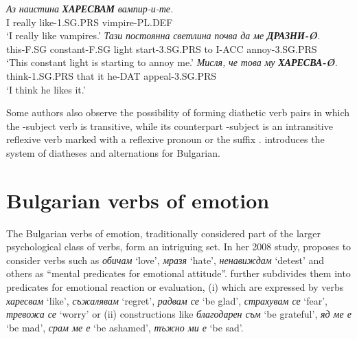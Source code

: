 \documentclass[output=paper,colorlinks,citecolor=brown]{langscibook}
\begin{document}
\begin{exe} 
\ex  \label{ch6:ex2} 
\begin{xlist}
\ex\label{ch6:ex2a} 
\gll \textit{Аз} \textit{наистина} \textit{\uppercase{\textbf{харесвам}}} \textit{вампир-и-те.} \\
I really like-1.SG.PRS vimpire-PL.DEF\\
\glt `I really  like  vampires.'
\ex\label{ch6:ex2b} 
\gll \textit{Тази} \textit{постоянна} \textit{светлина} \textit{почва} \textit{да} \textit{ме} \textit{{\textbf{ДРАЗНИ-Ø}}.} \\
this-F.SG constant-F.SG light start-3.SG.PRS to I-ACC annoy-3.SG.PRS\\
\glt `This constant light is starting to  annoy me.'
\ex\label{ch6:ex2c} 
\gll \textit{Мисля,} \textit{че} \textit{това} \textit{му} \textit{\uppercase{\textbf{харесва-Ø}}.} \\
think-1.SG.PRS that it he-DAT appeal-3.SG.PRS\\
\glt `I think he likes it.'
\end{xlist}
\end{exe}



Some authors also observe the possibility of forming diathetic verb pairs in which the -subject verb is transitive, while its counterpart -subject is an intransitive reflexive verb marked with a reflexive pronoun or the suffix \citep [121]{ovsjannikova2020instrumental}. \citet{koevaсистема} introduces the system of diatheses and alternations for Bulgarian.


\section{Bulgarian verbs of emotion} \label{ch6:sec:4}

The Bulgarian verbs of emotion, traditionally considered part of the larger psychological class of verbs, form an intriguing set. In her 2008 study, \citet [265]{ницолова2008проблематика} proposes to consider verbs such as \textit{обичам} `love', \textit{мразя} `hate', \textit{нена\-виждам} `detest' and others as ``mental predicates for emotional attitude''. \citet[62--63]{koeva2019complements} further subdivides them into predicates for emotional reaction or evaluation, (i) which are expressed by verbs \textit{харесвам} `like', \textit{съжалявам} `regret', \textit{радвам се} `be glad', \textit{страхувам се} `fear', \textit{тревожа се} `worry' or (ii) constructions like \textit{благодарен съм} `be grateful', \textit{яд ме е} `be mad', \textit{срам ме е} `be ashamed', \textit{тъжно ми е} `be sad'.
\end{document}
